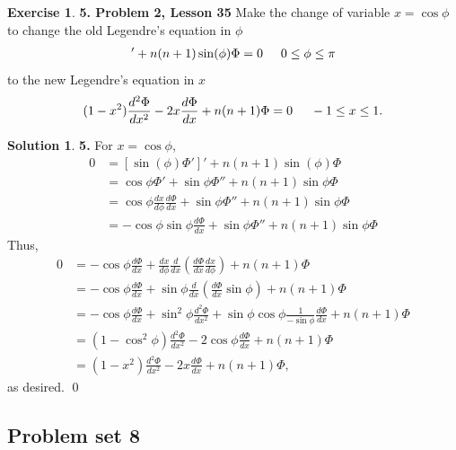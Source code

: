 \documentclass{article}
\theoremstyle{definition}
\newtheorem*{exer*}{Exercise}
\newtheorem*{sln*}{Solution}
\newcommand{\f}[2]{\frac{#1}{#2}}
\newcommand{\lp}{\left(}
\newcommand{\rp}{\right)}
\begin{document}
\begin{exer*}\textbf{5. Problem 2, Lesson 35} 
	Make the change of variable $x = \cos\phi$ to change the old Legendre's equation in $\phi$
	\begin{align*}
	[\sin(\phi)\Phi']' + n(n+1)\sin(\phi)\Phi = 0 \hspace{0.5cm} 0 \leq \phi \leq \pi
	\end{align*}
	to the new Legendre's equation in $x$
	\begin{align*}
	(1-x^2)\f{d^2\Phi}{dx^2} -2x\f{d\Phi}{dx} + n(n+1)\Phi = 0 \hspace{0.5cm} -1 \leq x \leq 1.
	\end{align*}
	
	\begin{sln*}\textbf{5. } For $x = \cos\phi$,
	\begin{align*}
	0&=[\sin(\phi)\Phi']' + n(n+1)\sin(\phi)\Phi\\		
	&= \cos\phi \Phi' + \sin\phi \Phi'' + n(n+1)\sin\phi \Phi\\
	&= \cos\phi \f{dx}{d\phi}\f{d\Phi}{dx} + \sin\phi \Phi'' + n(n+1)\sin\phi \Phi\\
	&= -\cos\phi \sin\phi\f{d\Phi}{dx} + \sin\phi \Phi'' + n(n+1)\sin\phi \Phi
	\end{align*}
	Thus,
	\begin{align*}
	0&= -\cos\phi\f{d\Phi}{dx} + \f{dx}{d\phi}\f{d}{dx}\lp  \f{d\Phi}{dx}\f{dx}{d\phi} \rp + n(n+1)\Phi\\
	&= -\cos\phi\f{d\Phi}{dx} + \sin\phi \f{d}{dx}\lp \f{d\Phi}{dx}\sin\phi \rp + n(n+1)\Phi\\
	&= -\cos\phi\f{d\Phi}{dx} + \sin^2\phi \f{d^2\Phi}{dx^2} + \sin\phi \cos\phi \f{1}{-\sin\phi}\f{d\Phi}{dx} + n(n+1)\Phi\\
	&= (1-\cos^2\phi)\f{d^2\Phi}{dx^2} -2\cos\phi\f{d\Phi}{dx} + n(n+1)\Phi\\
	&= (1-x^2)\f{d^2\Phi}{dx^2} -2x\f{d\Phi}{dx} + n(n+1)\Phi,
	\end{align*}
	as desired. \qed
	
\end{sln*}
	

\end{exer*}


\newpage
\subsection{Problem set 8}
\end{document}
